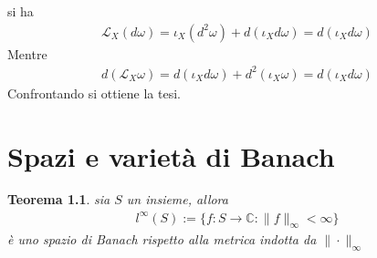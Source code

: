 \documentclass[twoside, 11pt]{amsbook}
\makeatletter
\newcommand{\0}{{(0)}}
\newcommand{\3}{{(3)}}
\theoremstyle{colonplain}
\newtheorem{thm}{Teorema}[chapter]
\theoremstyle{colondefinition}
\theoremstyle{colonremark}
\numberwithin{equation}{chapter}
\renewcommand{\proofname}{Dimostrazione}
\renewenvironment{proof}[1][\proofname]{\par
  \pushQED{\qed}%
  \normalfont \topsep6\p@\@plus6\p@\relax
  \trivlist
  \item[\hskip\labelsep\bfseries #1:]\ignorespaces
}{%
  \popQED\endtrivlist\@endpefalse
}
\makeatother
\begin{document}
\begin{proof} si ha
\begin{align}
    \mathcal{L}_X(d\omega) = \iota_X(d^2\omega) + d(\iota_X d\omega) = d(\iota_X d\omega)
\end{align}
Mentre
\begin{align}
    d\left(\mathcal{L}_X\omega\right) = d(\iota_X d\omega) + d^2(\iota_X \omega) = d(\iota_X d\omega)
\end{align}
Confrontando si ottiene la tesi.
\end{proof}

\chapter{Spazi e varietà di Banach}
\begin{thm}\label{SBanach} sia $S$ un insieme, allora
\begin{align}
    l^\infty(S) := \{f : S \longrightarrow \mathbb{C} : \|f\|_\infty < \infty\} 
\end{align}
è uno spazio di Banach rispetto alla metrica indotta da $\|\cdot\|_\infty$
\end{thm}
\end{document}
